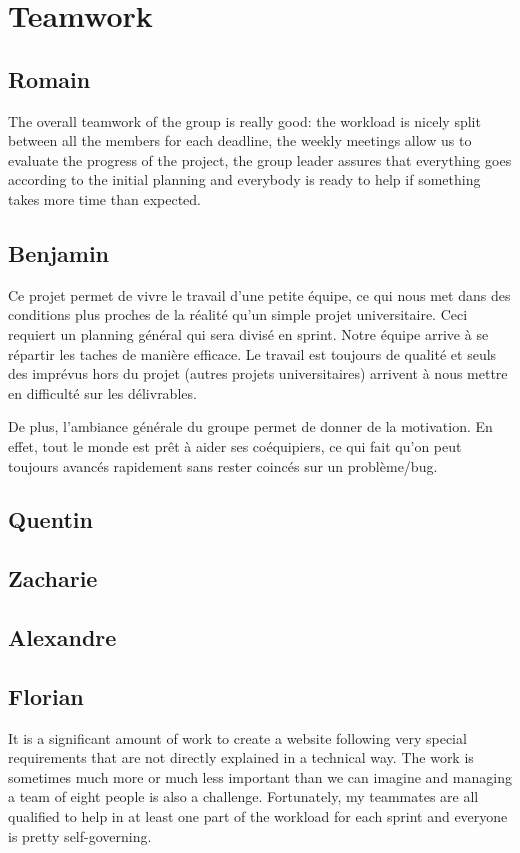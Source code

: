 \section{Teamwork}

\subsection{Romain}
The overall teamwork of the group is really good: the workload is nicely
split between all the members for each deadline, the weekly meetings allow
us to evaluate the progress of the project, the group leader assures that
everything goes according to the initial planning and everybody is ready to
help if something takes more time than expected. \newline

\subsection{Benjamin}

Ce projet permet de vivre le travail d'une petite équipe, ce qui nous met dans des conditions plus proches de la réalité qu'un simple projet universitaire. Ceci requiert un planning général qui sera divisé en sprint. Notre équipe arrive à se répartir les taches de manière efficace. Le travail est toujours de qualité et seuls des imprévus hors du projet (autres projets universitaires) arrivent à nous mettre en difficulté sur les délivrables. \newline

De plus, l'ambiance générale du groupe permet de donner de la motivation. En effet, tout le monde est prêt à aider ses coéquipiers, ce qui fait qu'on peut toujours avancés rapidement sans rester coincés sur un problème/bug.

\subsection{Quentin}
\subsection{Zacharie}
\subsection{Alexandre}
\subsection{Florian}
It is a significant amount of work to create a website following very
special requirements that are not directly explained in a technical way.
The work is sometimes much more or much less important than we can imagine and
managing a team of eight people is also a challenge. Fortunately, my
teammates are all qualified to help in at least one part of the workload for
each sprint and everyone is pretty self-governing. \newline

